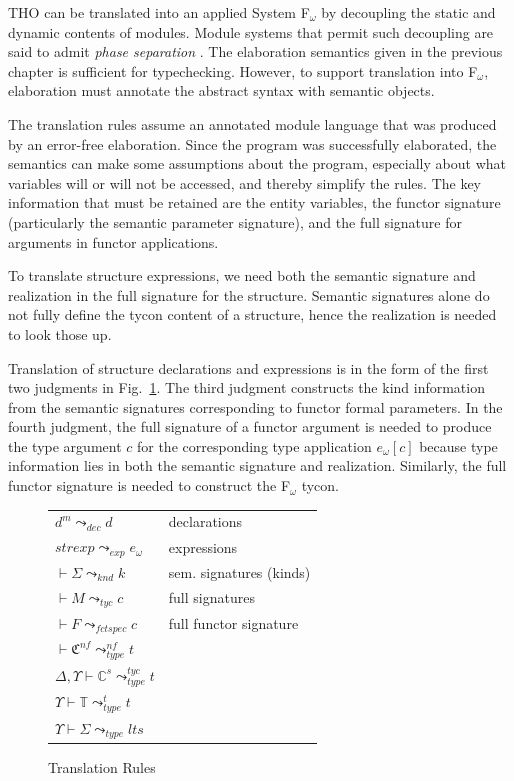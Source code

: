 \documentclass[9pt,nocopyrightspace, fleqn]{sigplanconf}
\begin{document}
THO can be translated into an applied System
F$_\omega$ by decoupling the static and dynamic contents of modules.
Module systems that permit such decoupling are said to admit
\emph{phase separation} \cite{hmm:phasedist}. The elaboration
semantics given in the previous chapter is sufficient 
for typechecking. However, to support translation into F$_\omega$,
elaboration must annotate the abstract syntax with semantic objects. 

The translation rules assume an annotated module language that was
produced by an error-free elaboration. Since the program was
successfully elaborated, the semantics can make some assumptions about
the program, especially about what variables will or will not be accessed,
and thereby simplify the rules. %
The key information that must be retained are the entity variables,
the functor signature (particularly the semantic parameter signature),
and the full signature for arguments in functor applications. 

To translate structure expressions, we need both the semantic
signature and realization in the full signature for the
structure. Semantic signatures alone do not fully define the tycon
content of a structure, hence the realization is needed to look those
up. 

Translation of structure declarations and expressions is in the form
of the first two judgments in Fig.~\ref{fig:xlate-rules-summary}. The
third judgment constructs the kind information from the semantic
signatures corresponding to functor formal parameters. 
In the fourth judgment, the full
signature of a functor argument is needed to produce the type argument $c$
for the corresponding type application $e_\omega[c]$ because type
information lies in both the semantic signature and
realization. Similarly, the full functor signature is needed to
construct the F$_\omega$ tycon. 

\begin{figure}
\begin{tabular}{ll}
$d^m \leadsto_{dec} d$ & declarations\\
$strexp \leadsto_{exp} e_\omega$ & expressions\\
$\vdash \Sigma \leadsto_{knd} k$ & sem. signatures (kinds)\\
$\vdash M \leadsto_{tyc} c$ & full signatures\\
$\vdash F \leadsto_{fctspec} c$ & full functor signature\\
$\vdash \mathfrak{C}^{nf}
\leadsto_{type}^{nf} t$ & \\
$\Delta, \Upsilon\vdash \mathbb{C}^s
\leadsto_{type}^{tyc} t$ & \\
$\Upsilon\vdash\mathbb{T}\leadsto_{type}^{t}
t$ & \\
$\Upsilon\vdash \Sigma \leadsto_{type} lts$ & \\
\end{tabular}
\caption{Translation Rules}
\label{fig:xlate-rules-summary}
\end{figure}
\end{document}
